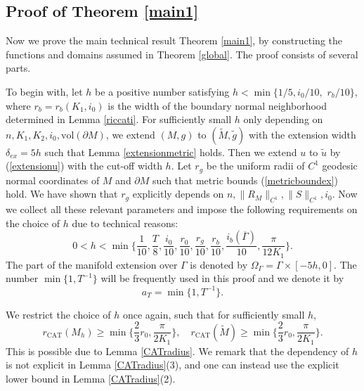 \documentclass[11pt,letterpaper]{amsart}
\numberwithin{equation}{section}
\theoremstyle{definition}
\theoremstyle{plain}
\theoremstyle{definition}
\theoremstyle{plain}
\theoremstyle{definition}
\theoremstyle{plain}
\newcommand{\vol}{\textrm{vol}}
\begin{document}
\subsection{Proof of Theorem \ref{main1}} \label{subsection3.4} \hfill 

\smallskip
Now we prove the main technical result Theorem \ref{main1}, by constructing the functions and domains assumed in Theorem \ref{global}. The proof consists of several parts.

To begin with, let $h$ be a positive number satisfying $h<\min\{1/5,i_0/10,$ $r_b/10\}$, where $r_b=r_b(K_1,i_0)$ is the width of the boundary normal neighborhood determined in Lemma \ref{riccati}. For sufficiently small $h$ only depending on $n,K_1,K_2,i_0,\vol(\partial M)$, we extend $(M,g)$ to $(\widetilde{M},\widetilde{g})$ with the extension width $\delta_{ex}=5h$ such that Lemma \ref{extensionmetric} holds. Then we extend $u$ to $\widetilde{u}$ by (\ref{extensionu}) with the cut-off width $h$. Let $r_g$ be the uniform radii of $C^1$ geodesic normal coordinates of $M$ and $\partial M$ such that metric bounds (\ref{metricboundex}) hold. We have shown that $r_g$ explicitly depends on $n,\|R_M\|_{C^1},\|S\|_{C^1},i_0$. Now we collect all these relevant parameters and impose the following requirements on the choice of $h$ due to technical reasons:
\begin{equation}
0<h<\min\big\{\frac{1}{10}, \frac{T}{8},\frac{i_0}{10},\frac{r_0}{10},\frac{r_g}{10},\frac{r_b}{10},\frac{i_b(\overline{\Gamma})}{10},\frac{\pi}{12K_1}\big\}.
\end{equation}
The part of the manifold extension over $\Gamma$ is denoted by $\Omega_{\Gamma}=\Gamma\times [-5h,0]$. The number $\min\{1,T^{-1}\}$ will be frequently used in this proof and we denote it by
\begin{equation}\label{aT}
a_T=\min\{1,T^{-1}\}.
\end{equation}

We restrict the choice of $h$ once again, such that for sufficiently small $h$,
\begin{equation}\label{CATchoice}
r_{\textrm{CAT}}(M_h)\geqslant \min\big\{\frac{2}{3}r_0,\frac{\pi}{2K_1}\big\},\quad r_{\textrm{CAT}}(\widetilde{M})\geqslant \min\big\{\frac{2}{3}r_0,\frac{\pi}{2K_1}\big\}.
\end{equation}
This is possible due to Lemma \ref{CATradius}. We remark that the dependency of $h$ is not explicit in Lemma \ref{CATradius}(3), and one can instead use the explicit lower bound in Lemma \ref{CATradius}(2).
\end{document}

